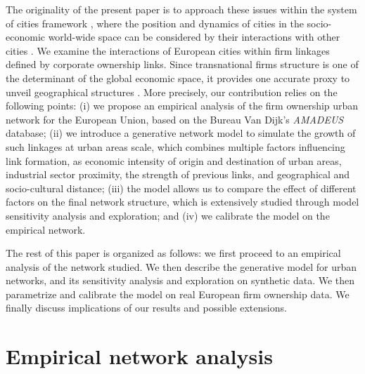 \documentclass[11pt]{article}
\begin{document}


The originality of the present paper is to approach these issues within the system of cities framework \citep{berry1964cities}, where the position and dynamics of cities in the socio-economic world-wide space can be considered by their interactions with other cities \cite{pumain2018evolutionary}. We examine the interactions of European cities within firm linkages defined by corporate ownership links. Since transnational firms structure is one of the determinant of the global economic space, it provides one accurate proxy to unveil geographical structures \cite{2019arXiv191014652Z}. More precisely, our contribution relies on the following points: (i) we propose an empirical analysis of the firm ownership urban network for the European Union, based on the Bureau Van Dijk's \emph {AMADEUS} database; (ii) we introduce a generative network model to simulate the growth of such linkages at urban areas scale, which combines multiple factors influencing link formation, as economic intensity of origin and destination of urban areas, industrial sector proximity, the strength of previous links, and geographical and socio-cultural distance; (iii) the model allows us to compare the effect of different factors on the final network structure, which is extensively studied through model sensitivity analysis and exploration; and (iv) we calibrate the model on the empirical network.


The rest of this paper is organized as follows: we first proceed to an empirical analysis of the network studied. We then describe the generative model for urban networks, and its sensitivity analysis and exploration on synthetic data. We then parametrize and calibrate the model on real European firm ownership data. We finally discuss implications of our results and possible extensions.


\section{Empirical network analysis}
\end{document}
